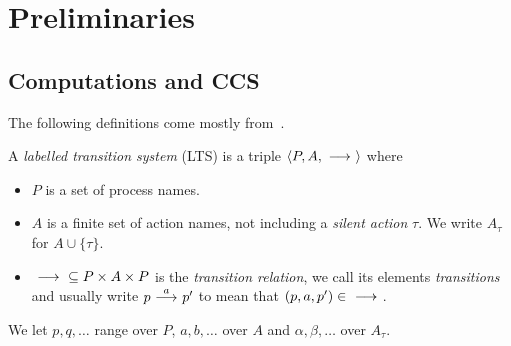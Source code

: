 
\section{Preliminaries}\label{sec:preliminaries}
\subsection{Computations and CCS} %
The following definitions come mostly from~\cite{DeNicola:1990}.

\begin{definition}
    A \emph{labelled transition system} (LTS)
    is a triple $\langle P,A,\ {\stackrel{{}}{\longrightarrow}}\ \rangle$ where
    \begin{itemize}
        \item $P$ is a set of process names.
        \item $A$ is a finite set of action names, not including a \emph{silent action}
              $\tau$. We write $A_\tau$ for $A\cup \{\tau\}$.
        \item $\ {\stackrel{{}}{\longrightarrow}}\ \subseteq P\times A\times P$ is the \emph{transition
              relation}, we call its elements \emph{transitions} and
              usually write $p\ {\stackrel{{a}}{\longrightarrow}}\ p'$ to mean that $(p,a,p')\in\ {\stackrel{{}}{\longrightarrow}}\ $.
    \end{itemize}
    We let $p,q,\dots$ range over $P$, $a,b,\dots$ over $A$ and $\alpha,\beta,\dots$
    over $A_\tau$.
\end{definition}

